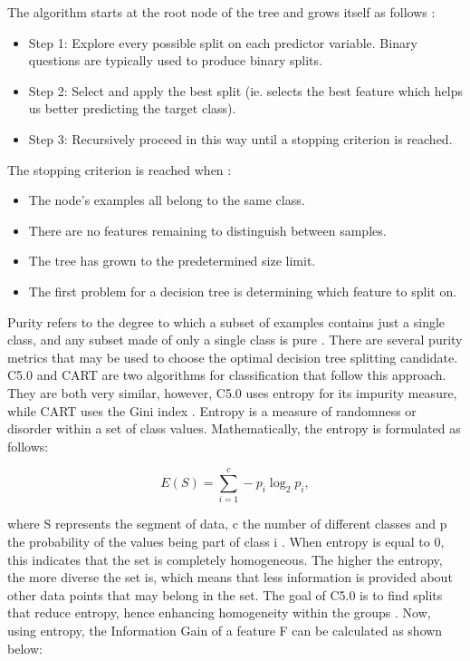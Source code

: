 \documentclass{usiinftr}
\begin{document}
The algorithm starts at the root node of the tree and grows itself as follows \cite{3}: 
\begin{itemize}
\item Step 1: Explore every possible split on each predictor variable. Binary questions are typically used to produce binary splits.
\item Step 2: Select and apply the best split (ie. selects the best feature which helps us better predicting the target class).
\item Step 3: Recursively proceed in this way until a stopping criterion is reached. 
\end{itemize}

The stopping criterion is reached when \cite{4}:
\begin{itemize}
\item The node's examples all belong to the same class.
\item There are no features remaining to distinguish between samples.
\item The tree has grown to the predetermined size limit. 
\item The first problem for a decision tree is determining which feature to split on.
\end{itemize}

Purity refers to the degree to which a subset of examples contains just a single class, and any subset made of only a single class is pure \cite{4}. There are several purity metrics that may be used to choose the optimal decision tree splitting candidate. C5.0 and CART are two algorithms for classification that follow this approach. They are both very similar, however, C5.0 uses entropy for its impurity measure, while CART uses the Gini index \cite{2}. Entropy is a measure of randomness or disorder within a set of class values. Mathematically, the entropy is formulated as follows: 

\begin{equation}
E(S)=\sum_{i=1}^{c}-p_{i} \log _{2} p_{i},
\end{equation}

where S represents the segment of data, c the number of different classes and p the probability of the values being part of class i \cite{4}. When entropy is equal to 0, this indicates that the set is completely homogeneous. The higher the entropy, the more diverse the set is, which means that less information is provided about other data points that may belong in the set. The goal of C5.0 is to find splits that reduce entropy,  hence enhancing homogeneity within the groups \cite{4}. Now, using entropy, the Information Gain of a feature F can be calculated as shown below\cite{4}:
\end{document}
